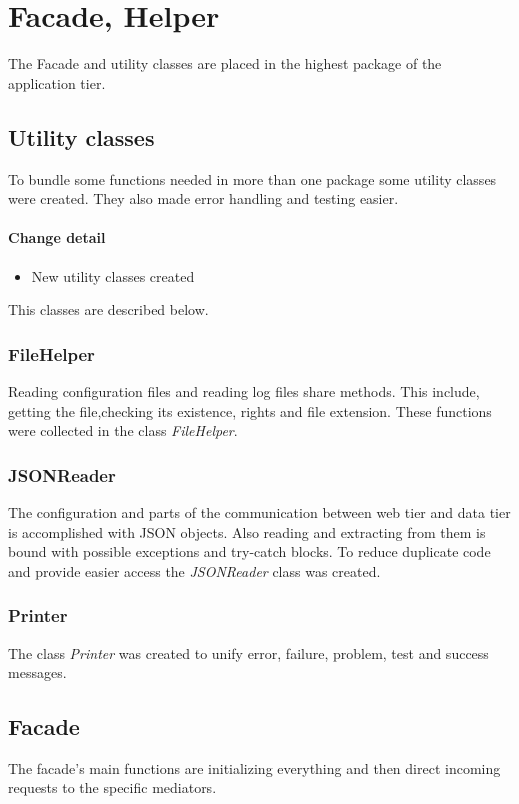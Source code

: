 \section{Facade, Helper}
The Facade and utility classes are placed in the highest package of the application tier.

\subsection{Utility classes}\label{utility}
To bundle some functions needed in more than one package some utility
classes were created. They also made error handling and 
testing easier.

\paragraph{Change detail}
\begin{itemize}
  \item New utility classes created
\end{itemize}

This classes are described below.

\subsubsection{FileHelper}
Reading configuration files and reading log files share methods.
This include, getting the file,checking its existence,
rights and file extension. These functions
were collected in the class \textit{FileHelper}.

\subsubsection{JSONReader}\label{reader}
The configuration and parts of the communication between web tier
and data tier is accomplished with JSON objects. Also reading and
extracting from them is bound with possible exceptions and try-catch blocks.
To reduce duplicate code and provide easier access the \textit{JSONReader} class
was created.

\subsubsection{Printer}
The class \textit{Printer} was created to unify error, failure, problem, test
and success messages.


\subsection{Facade}
The facade's main functions are initializing everything and then direct incoming requests to
the specific mediators.

